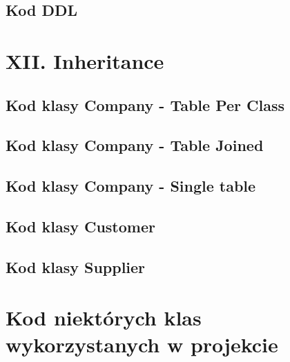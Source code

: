 \documentclass[a4paper, 11pt]{article}
\begin{document}
    \newpage

    \subsection{Kod DDL}
    

    \newpage



    \section{XII. Inheritance}

    \subsection{Kod klasy Company - Table Per Class}
    

    \newpage

    \subsection{Kod klasy Company - Table Joined}
    

    \newpage

    \subsection{Kod klasy Company - Single table}
    

    \newpage

    \subsection{Kod klasy Customer}
    

    \newpage

    \subsection{Kod klasy Supplier}
    


    \newpage

    \section{Kod niektórych klas wykorzystanych w projekcie}
\end{document}
